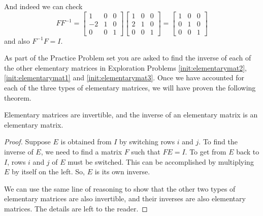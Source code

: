\documentclass{ximera}
\begin{document}
And indeed we can check $$F F^{-1} = \begin{bmatrix}  
 1&0&0\\-2&1&0\\0&0&1
 \end{bmatrix} \begin{bmatrix}  
 1&0&0\\2&1&0\\0&0&1
 \end{bmatrix} = \begin{bmatrix}  
 1&0&0\\0&1&0\\0&0&1
 \end{bmatrix}$$
 and also $ F^{-1} F = I$.

As part of the Practice Problem set you are asked to find the inverse of each of the other elementary matrices in Exploration Problems \ref{init:elementarymat2}, \ref{init:elementarymat1} and \ref{init:elementarymat3}.  Once we have accounted for each of the three types of elementary matrices, we will have proven the following theorem.  

\begin{theorem}\label{th:elemmatricesinvertible}
Elementary matrices are invertible, and the inverse of an elementary matrix is an elementary matrix.
\end{theorem}

\begin{proof}
Suppose $E$ is obtained from $I$ by switching rows $i$ and $j$.  To find the inverse of $E$, we need to find a matrix $F$ such that $FE=I$.  To get from $E$ back to $I$, rows $i$ and $j$ of $E$ must be switched.  This can be accomplished by multiplying $E$ by itself on the left.  So, $E$ is its own inverse.

We can use the same line of reasoning to show that the other two types of elementary matrices are also invertible, and their inverses are also elementary matrices.  The details are left to the reader. 
\end{proof}



 
\end{document}

